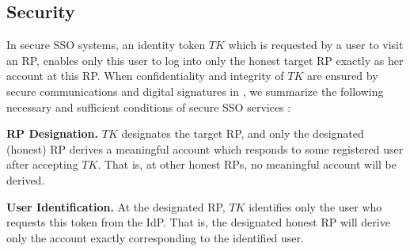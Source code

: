\subsection{Security}
\label{analysis-security}


In secure SSO systems, an identity token $TK$ which is requested by a user to visit an RP,
    enables only this user to log into only the honest target RP exactly as her account at this RP.
When confidentiality and integrity of $TK$ are ensured by secure communications and digital signatures in \usso, we summarize the following necessary and sufficient conditions of secure SSO services \cite{FettKS14,BrowserID,SPRESSO}:

\noindent \textbf{RP Designation.} $TK$ designates the target RP,
    and only the designated (honest) RP derives a meaningful account which responds to some registered user after accepting $TK$.
That is, at other honest RPs, no meaningful account will be derived.

\noindent \textbf{User Identification.} At the designated RP, $TK$ identifies only the user who requests this token from the IdP. That is, the designated honest RP will derive only the account exactly corresponding to the identified user.




